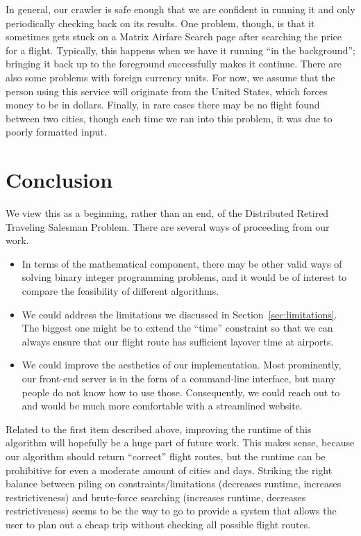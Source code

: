 \documentclass{article}
\begin{document}
In general, our crawler is safe enough that we are confident in running it and only periodically checking back on its results. One problem, though, is
that it sometimes gets stuck on a Matrix Airfare Search page after searching the price for a flight. Typically, this happens when we have it running
``in the background''; bringing it back up to the foreground successfully makes it continue. There are also some problems with foreign currency units.
For now, we assume that the person using this service will originate from the United States, which forces money to be in dollars. Finally, in rare
cases there may be no flight found between two cities, though each time we ran into this problem, it was due to poorly formatted input.


\section{Conclusion}\label{sec:conclusion}

We view this as a beginning, rather than an end, of the Distributed Retired Traveling Salesman Problem. There are several ways of proceeding from our
work.

\begin{itemize}[noitemsep]
    \item In terms of the mathematical component, there may be other valid ways of solving binary integer programming problems, and it would be of
    interest to compare the feasibility of different algorithms.
    \item We could address the limitations we discussed in Section~\ref{sec:limitations}. The biggest one might be to extend the ``time'' constraint
    so that we can always ensure that our flight route has sufficient layover time at airports.
    \item We could improve the aesthetics of our implementation. Most prominently, our front-end server is in the form of a command-line interface,
    but many people do not know how to use those. Consequently, we could reach out to and would be much more comfortable with a streamlined website.
\end{itemize}

Related to the first item described above, improving the runtime of this algorithm will hopefully be a huge part of future work. This makes sense,
because our algorithm should return ``correct'' flight routes, but the runtime can be prohibitive for even a moderate amount of cities and days.
Striking the right balance between piling on constraints/limitations (decreases runtime, increases restrictiveness) and brute-force searching
(increases runtime, decreases restrictiveness) seems to be the way to go to provide a system that allows the user to plan out a cheap trip without
checking all possible flight routes.
\end{document}
